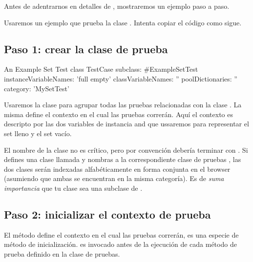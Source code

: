 \documentclass[a4paper,10pt,twoside]{book}
\begin{document}
Antes de adentrarnos en detalles de \SUnit, mostraremos un ejemplo
paso a paso.

Usaremos un ejemplo que prueba la clase . Intenta copiar el c\'odigo como sigue.

\subsection{Paso 1: crear la clase de prueba}


\begin{classdef}[exampleSetTest]{An Example Set Test class}
TestCase subclass: #ExampleSetTest
	instanceVariableNames: 'full empty'
	classVariableNames: ''
	poolDictionaries: ''
	category: 'MySetTest'
\end{classdef}


Usaremos la clase  para agrupar todas las pruebas relacionadas con
la clase .  La misma define el contexto en el cual las pruebas
correr\'an. Aqu\'i el contexto es descripto por las dos variables de instancia  and 
que ussaremos para representar el set lleno y el set vac\'io.

El nombre de la clase no es cr\'itico, pero por convenci\'on deber\'ia terminar con .
Si defines una clase llamada  y nombras a la correspondiente clase de pruebas ,
las dos clases ser\'an indexadas alfab\'eticamente en forma conjunta en el browser (asumiendo
que ambas se encuentran en la misma categor\'ia).  Es de \emph{suma importancia} que tu clase 
sea una subclase de .

\subsection{Paso 2: inicializar el contexto de prueba}

El m\'etodo  define el contexto en el cual las
pruebas correr\'an, es una especie de m\'etodo de inicializaci\'on.
 es invocado antes de la ejecuci\'on de cada m\'etodo de  prueba definido
en la clase de pruebas.

\end{document}
